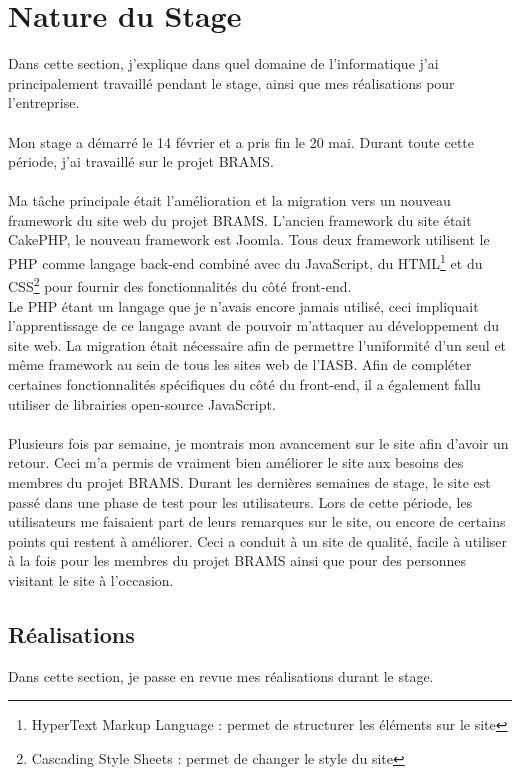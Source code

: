 \documentclass[11pt]{article}
\begin{document}
\section{Nature du Stage}
Dans cette section, j'explique dans quel domaine de l'informatique j'ai principalement travaillé pendant le stage, ainsi que mes réalisations pour l'entreprise.\\
\\
Mon stage a démarré le 14 février et a pris fin le 20 mai. Durant toute cette période, j'ai travaillé sur le projet BRAMS.\\
\\
Ma tâche principale était l'amélioration et la migration vers un nouveau framework du site web du projet BRAMS.
L'ancien framework du site était CakePHP, le nouveau framework est Joomla. Tous deux framework utilisent le PHP comme langage back-end combiné avec du JavaScript, du HTML\footnote{HyperText Markup Language : permet de structurer les éléments sur le site} et du CSS\footnote{Cascading Style Sheets : permet de changer le style du site} pour fournir des fonctionnalités du côté front-end.\\
Le PHP étant un langage que je n'avais encore jamais utilisé, ceci impliquait l'apprentissage de ce langage avant de pouvoir m'attaquer au développement du site web.
La migration était nécessaire afin de permettre l'uniformité d'un seul et même framework au sein de tous les sites web de l'IASB.
Afin de compléter certaines fonctionnalités spécifiques du côté du front-end, il a également fallu utiliser de librairies open-source JavaScript.\\
\\
Plusieurs fois par semaine, je montrais mon avancement sur le site afin d'avoir un retour.
Ceci m'a permis de vraiment bien améliorer le site aux besoins des membres du projet BRAMS.
Durant les dernières semaines de stage, le site est passé dans une phase de test pour les utilisateurs.
Lors de cette période, les utilisateurs me faisaient part de leurs remarques sur le site, ou encore de certains points qui restent à améliorer.
Ceci a conduit à un site de qualité, facile à utiliser à la fois pour les membres du projet BRAMS ainsi que pour des personnes visitant le site à l'occasion.

\subsection{Réalisations}
Dans cette section, je passe en revue mes réalisations durant le stage.
\end{document}

